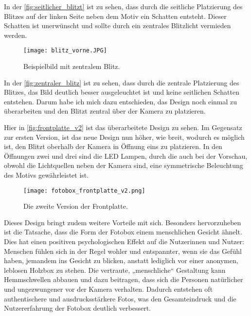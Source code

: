 In der \autoref{fig:seitlicher_blitzt} ist zu sehen, dass durch die seitliche Platzierung des Blitzes 
auf der linken Seite neben dem Motiv ein Schatten entsteht. Dieser Schatten ist unerwünscht und sollte
durch ein zentrales Blitzlicht vermieden werden.

\begin{figure}[H]
    \centering
    \texttt{[image: blitz\_vorne.JPG]}
    \caption{Beispielbild mit zentralem Blitz.}
    \label{fig:zentraler_blitz}
\end{figure}

In der \autoref{fig:zentraler_blitz} ist zu sehen, dass durch die zentrale Platzierung des Blitzes,
das Bild deutlich besser ausgeleuchtet ist und keine seitlichen Schatten entstehen.
Darum habe ich mich dazu entschieden, das Design noch einmal zu überarbeiten und
den Blitzt zentral über der Kamera zu platzieren.

\newpage

Hier in \autoref{fig:frontplatte_v2} ist das überarbeitete Design zu sehen.
Im Gegensatz zur ersten Version, ist das neue Design 
nun höher, wie breit, wodurch es möglich ist, den Blitzt oberhalb der Kamera in 
Öffnung eins zu platzieren. In den Öffnungen zwei und drei sind die LED Lampen,
durch die auch bei der Vorschau, obwohl die Lichtquellen neben der Kamera sind,
eine symmetrische Beleuchtung des Motivs gewährleistet ist.

\begin{figure}[H]
    \centering
    \texttt{[image: fotobox\_frontplatte\_v2.png]}
    \caption{Die zweite Version der Frontplatte.}
    \label{fig:frontplatte_v2}
\end{figure}

Dieses Design bringt zudem weitere Vorteile mit sich. Besonders hervorzuheben
ist die Tatsache, dass die Form der Fotobox einem menschlichen Gesicht ähnelt.
Dies hat einen positiven psychologischen Effekt auf die Nutzerinnen und Nutzer:
Menschen fühlen sich in der Regel wohler und entspannter, wenn sie das Gefühl
haben, jemandem ins Gesicht zu blicken, anstatt lediglich vor einer anonymen,
leblosen Holzbox zu stehen. Die vertraute, „menschliche“ Gestaltung kann
Hemmschwellen abbauen und dazu beitragen, dass sich die Personen natürlicher und
ungezwungener vor der Kamera verhalten. Dadurch entstehen oft authentischere und
ausdrucksstärkere Fotos, was den Gesamteindruck und die Nutzererfahrung der Fotobox
deutlich verbessert.

\newpage


